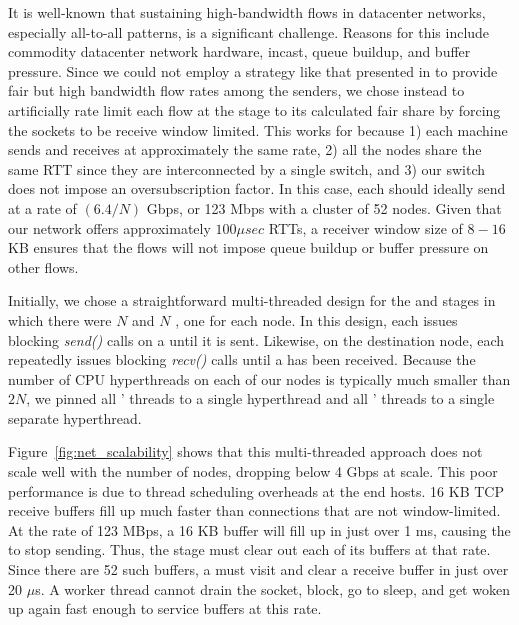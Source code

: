 It is well-known that sustaining high-bandwidth flows in datacenter networks,
especially all-to-all patterns, is a significant challenge.  Reasons for this
include commodity datacenter network hardware, incast, queue buildup, and
buffer pressure\cite{dctcp}.  Since we could not employ a strategy like that
presented in \cite{dctcp} to provide fair but high bandwidth flow rates among
the senders, we chose instead to artificially rate limit each flow at the
\sender stage to its calculated fair share by forcing the sockets to be receive
window limited.  This works for \tritonsort because 1) each machine sends and
receives at approximately the same rate, 2) all the nodes share the same RTT
since they are interconnected by a single switch, and 3) our switch
does not impose an oversubscription factor.  In this case, each \sender should
ideally send at a rate of $(6.4 / N)$ Gbps, or 123 Mbps with a cluster of 52
nodes.  Given that our network offers approximately $100 \mu{}sec$ RTTs, a
receiver window size of $8-16$ KB ensures that the flows will not impose queue
buildup or buffer pressure on other flows.

Initially, we chose a straightforward multi-threaded design for the \sender and
\receiver stages in which there were $N$ \senders and $N$ \receivers, one for
each \tritonsort node.  In this design, each \sender issues blocking
\textit{send()} calls on a \nodebuffer until it is sent.  Likewise, on the
destination node, each \receiver repeatedly issues blocking \textit{recv()}
calls until a \nodebuffer has been received.  Because the number of CPU
hyperthreads on each of our nodes is typically much smaller than $2N$, we
pinned all \senders' threads to a single hyperthread and all \receivers'
threads to a single separate hyperthread.

Figure~\ref{fig:net_scalability} shows that this multi-threaded approach does
not scale well with the number of nodes, dropping below 4 Gbps at scale.  This
poor performance is due to thread scheduling overheads at the end hosts.  16 KB
TCP receive buffers fill up much faster than connections that are not
window-limited.  At the rate of 123 MBps, a 16 KB buffer will fill up in just
over 1 ms, causing the \sender to stop sending.  Thus, the \receiver stage must
clear out each of its buffers at that rate.  Since there are 52 such buffers, a
\receiver must visit and clear a receive buffer in just over 20 $\mu$s.  A
\receiver worker thread cannot drain the socket, block, go to sleep, and get
woken up again fast enough to service buffers at this rate.

